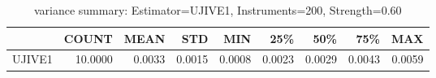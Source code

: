 \begin{table}[ht]
\centering
\caption{variance summary: Estimator=UJIVE1, Instruments=200, Strength=0.60}
\begin{tabular}{lrrrrrrrr}
\toprule
 & COUNT & MEAN & STD & MIN & 25\% & 50\% & 75\% & MAX \\
\midrule
UJIVE1 & 10.0000 & 0.0033 & 0.0015 & 0.0008 & 0.0023 & 0.0029 & 0.0043 & 0.0059 \\
\bottomrule
\end{tabular}
\end{table}
